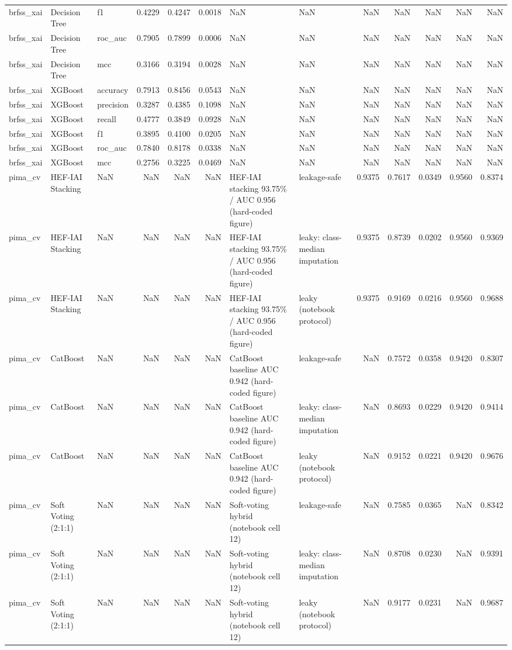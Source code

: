 \begin{tabular}{lllrrrllrrrrr}
brfss\_xai & Decision Tree & f1 & 0.4229 & 0.4247 & 0.0018 & NaN & NaN & NaN & NaN & NaN & NaN & NaN \\
brfss\_xai & Decision Tree & roc\_auc & 0.7905 & 0.7899 & 0.0006 & NaN & NaN & NaN & NaN & NaN & NaN & NaN \\
brfss\_xai & Decision Tree & mcc & 0.3166 & 0.3194 & 0.0028 & NaN & NaN & NaN & NaN & NaN & NaN & NaN \\
brfss\_xai & XGBoost & accuracy & 0.7913 & 0.8456 & 0.0543 & NaN & NaN & NaN & NaN & NaN & NaN & NaN \\
brfss\_xai & XGBoost & precision & 0.3287 & 0.4385 & 0.1098 & NaN & NaN & NaN & NaN & NaN & NaN & NaN \\
brfss\_xai & XGBoost & recall & 0.4777 & 0.3849 & 0.0928 & NaN & NaN & NaN & NaN & NaN & NaN & NaN \\
brfss\_xai & XGBoost & f1 & 0.3895 & 0.4100 & 0.0205 & NaN & NaN & NaN & NaN & NaN & NaN & NaN \\
brfss\_xai & XGBoost & roc\_auc & 0.7840 & 0.8178 & 0.0338 & NaN & NaN & NaN & NaN & NaN & NaN & NaN \\
brfss\_xai & XGBoost & mcc & 0.2756 & 0.3225 & 0.0469 & NaN & NaN & NaN & NaN & NaN & NaN & NaN \\
pima\_cv & HEF-IAI Stacking & NaN & NaN & NaN & NaN & HEF-IAI stacking 93.75\% / AUC 0.956 (hard-coded figure) & leakage-safe & 0.9375 & 0.7617 & 0.0349 & 0.9560 & 0.8374 \\
pima\_cv & HEF-IAI Stacking & NaN & NaN & NaN & NaN & HEF-IAI stacking 93.75\% / AUC 0.956 (hard-coded figure) & leaky: class-median imputation & 0.9375 & 0.8739 & 0.0202 & 0.9560 & 0.9369 \\
pima\_cv & HEF-IAI Stacking & NaN & NaN & NaN & NaN & HEF-IAI stacking 93.75\% / AUC 0.956 (hard-coded figure) & leaky (notebook protocol) & 0.9375 & 0.9169 & 0.0216 & 0.9560 & 0.9688 \\
pima\_cv & CatBoost & NaN & NaN & NaN & NaN & CatBoost baseline AUC 0.942 (hard-coded figure) & leakage-safe & NaN & 0.7572 & 0.0358 & 0.9420 & 0.8307 \\
pima\_cv & CatBoost & NaN & NaN & NaN & NaN & CatBoost baseline AUC 0.942 (hard-coded figure) & leaky: class-median imputation & NaN & 0.8693 & 0.0229 & 0.9420 & 0.9414 \\
pima\_cv & CatBoost & NaN & NaN & NaN & NaN & CatBoost baseline AUC 0.942 (hard-coded figure) & leaky (notebook protocol) & NaN & 0.9152 & 0.0221 & 0.9420 & 0.9676 \\
pima\_cv & Soft Voting (2:1:1) & NaN & NaN & NaN & NaN & Soft-voting hybrid (notebook cell 12) & leakage-safe & NaN & 0.7585 & 0.0365 & NaN & 0.8342 \\
pima\_cv & Soft Voting (2:1:1) & NaN & NaN & NaN & NaN & Soft-voting hybrid (notebook cell 12) & leaky: class-median imputation & NaN & 0.8708 & 0.0230 & NaN & 0.9391 \\
pima\_cv & Soft Voting (2:1:1) & NaN & NaN & NaN & NaN & Soft-voting hybrid (notebook cell 12) & leaky (notebook protocol) & NaN & 0.9177 & 0.0231 & NaN & 0.9687 \\
\bottomrule
\end{tabular}
